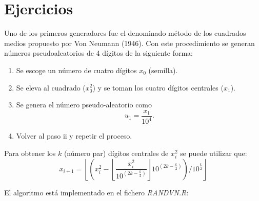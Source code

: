 \documentclass[
]{book}
\theoremstyle{break}
\theoremstyle{definition}
\theoremstyle{definition}
\theoremstyle{definition}
\theoremstyle{remark}
\let\BeginKnitrBlock\begin \let\EndKnitrBlock\end
\begin{document}
\hypertarget{ejercicios-1}{%
\section{Ejercicios}\label{ejercicios-1}}

\BeginKnitrBlock{exercise}
\protect\hypertarget{exr:unnamed-chunk-23}{}{\label{exr:unnamed-chunk-23} }
\EndKnitrBlock{exercise}

Uno de los primeros generadores fue el denominado método de los
cuadrados medios propuesto por Von Neumann (1946). Con este
procedimiento se generan números pseudoaleatorios de 4 dígitos de la
siguiente forma:

\begin{enumerate}
\def\labelenumi{\roman{enumi}.}
\item
  Se escoge un número de cuatro dígitos \(x_0\) (semilla).
\item
  Se eleva al cuadrado (\(x_0^2\)) y se toman los cuatro dígitos centrales (\(x_1\)).
\item
  Se genera el número pseudo-aleatorio como \[u_1=\frac{x_1}{10^{4}}.\]
\item
  Volver al paso ii y repetir el proceso.
\end{enumerate}

Para obtener los \(k\) (número par) dígitos centrales de \(x_{i}^2\)
se puede utilizar que:
\[x_{i+1}=\left\lfloor \left(  x_{i}^2-\left\lfloor \dfrac{x_{i}^2}{10^{(2k-\frac{k}2)}}\right\rfloor 10^{(2k-\frac{k}2)}\right)
/10^{\frac{k}2}\right\rfloor\]

El algoritmo está implementado en el fichero \emph{RANDVN.R}:
\end{document}
